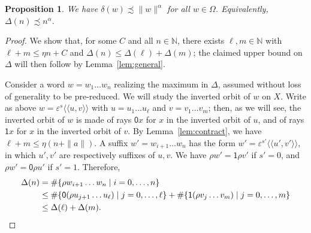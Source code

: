 \documentclass{amsart}
\newcommand\N{\mathbb{N}}
\def\pair<#1>{{\langle\!\langle}#1{\rangle\!\rangle}}
\newtheorem{proposition}[lemma]{Proposition}
\theoremstyle{definition}
\begin{document}
\begin{proposition}\label{main}
  We have $\delta(w)\precsim\|w\|^\alpha$ for all $w\in
  \Omega$. Equivalently, $\Delta(n)\precsim n^\alpha$.
\end{proposition}
\begin{proof}
  We show that, for some $C$ and all $n\in\N$, there exists
  $\ell,m\in\N$ with $\ell+m \le \eta n+C$ and $\Delta(n) \le
  \Delta(\ell)+\Delta(m)$; the claimed upper bound on $\Delta$ will
  then follow by Lemma~\ref{lem:general}.
 
  Consider a word $w=w_1\dots w_n$ realizing the maximum in $\Delta$,
  assumed without loss of generality to be pre-reduced. We will study
  the inverted orbit of $w$ on $X$. Write as above
  $w=\varepsilon^s\pair<u,v>$ with $u=u_1\dots u_\ell$ and $v=v_1\dots
  v_m$; then, as we will see, the inverted orbit of $w$ is made of
  rays $\mathsf0x$ for $x$ in the inverted orbit of $u$, and of rays
  $\mathsf1x$ for $x$ in the inverted orbit of $v$. By
  Lemma~\ref{lem:contract}, we have $\ell+m\le\eta(n+\|a\|)$. A suffix
  $w'=w_{i+1}\dots w_n$ has the form
  $w'=\varepsilon^{s'}\pair<u',v'>$, in which $u',v'$ are respectively
  suffixes of $u,v$. We have $\rho w'=\mathsf1\rho v'$ if $s'=0$, and
  $\rho w'=\mathsf0\rho u'$ if $s'=1$. Therefore,
  \begin{align*}
    \Delta(n) &= \#\{\rho w_{i+1}\dots w_n\mid i=0,\dots,n\}\\
    &\le \#\{\mathsf0(\rho u_{j+1}\dots u_\ell)\mid j=0,\dots,\ell\}+\#\{\mathsf1(\rho v_j\dots v_m)\mid j=0,\dots,m\}\\
    &\le \Delta(\ell)+\Delta(m).\qedhere
  \end{align*}
\end{proof}
\end{document}
